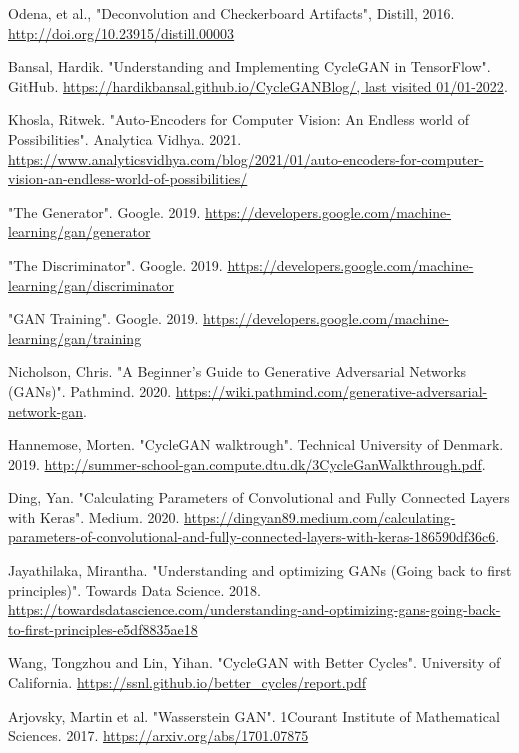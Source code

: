 \documentclass[12pt, fleqn, titlepage]{article}
\newcommand{\1}[1]{\mathds{1}\left[#1\right]}
\begin{document}
\begin{thebibliography}{9}
		 Odena, et al., "Deconvolution and Checkerboard Artifacts", Distill, 2016. \url{http://doi.org/10.23915/distill.00003}
		
		 Bansal, Hardik. "Understanding and Implementing CycleGAN in TensorFlow". GitHub. \url{https://hardikbansal.github.io/CycleGANBlog/, last visited 01/01-2022}.
		
		 Khosla, Ritwek. "Auto-Encoders for Computer Vision: An Endless world of Possibilities". Analytica Vidhya. 2021. \url{https://www.analyticsvidhya.com/blog/2021/01/auto-encoders-for-computer-vision-an-endless-world-of-possibilities/}
		
		 "The Generator". Google. 2019. \url{https://developers.google.com/machine-learning/gan/generator}
		
		 "The Discriminator". Google. 2019. \url{https://developers.google.com/machine-learning/gan/discriminator}
		
		 "GAN Training". Google. 2019. \url{https://developers.google.com/machine-learning/gan/training}
		
		 Nicholson, Chris. "A Beginner's Guide to Generative Adversarial Networks (GANs)". Pathmind. 2020. \url{https://wiki.pathmind.com/generative-adversarial-network-gan}.
		
		 Hannemose, Morten. "CycleGAN walktrough". Technical University of Denmark. 2019. \url{http://summer-school-gan.compute.dtu.dk/3CycleGanWalkthrough.pdf}.
		
		 Ding, Yan. "Calculating Parameters of Convolutional and Fully Connected Layers with Keras". Medium. 2020. \url{https://dingyan89.medium.com/calculating-parameters-of-convolutional-and-fully-connected-layers-with-keras-186590df36c6}.
		
		 Jayathilaka, Mirantha. "Understanding and optimizing GANs (Going back to first principles)". Towards Data Science. 2018. \url{https://towardsdatascience.com/understanding-and-optimizing-gans-going-back-to-first-principles-e5df8835ae18}
		
		 Wang, Tongzhou and Lin, Yihan. "CycleGAN with Better Cycles". University of California. \url{https://ssnl.github.io/better_cycles/report.pdf}
		
		 Arjovsky, Martin et al. "Wasserstein GAN". 1Courant Institute of Mathematical Sciences. 2017. \url{https://arxiv.org/abs/1701.07875}
		

\end{thebibliography}
\end{document}
